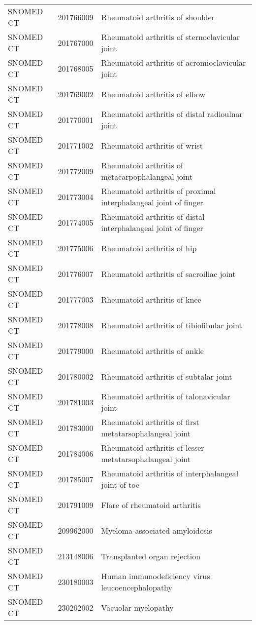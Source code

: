 \begin{longtable}{p{}p{}p{}}
  SNOMED CT & 201766009 & Rheumatoid arthritis of shoulder \\ 
  SNOMED CT & 201767000 & Rheumatoid arthritis of sternoclavicular joint \\ 
  SNOMED CT & 201768005 & Rheumatoid arthritis of acromioclavicular joint \\ 
  SNOMED CT & 201769002 & Rheumatoid arthritis of elbow \\ 
  SNOMED CT & 201770001 & Rheumatoid arthritis of distal radioulnar joint \\ 
  SNOMED CT & 201771002 & Rheumatoid arthritis of wrist \\ 
  SNOMED CT & 201772009 & Rheumatoid arthritis of metacarpophalangeal joint \\ 
  SNOMED CT & 201773004 & Rheumatoid arthritis of proximal interphalangeal joint of finger \\ 
  SNOMED CT & 201774005 & Rheumatoid arthritis of distal interphalangeal joint of finger \\ 
  SNOMED CT & 201775006 & Rheumatoid arthritis of hip \\ 
  SNOMED CT & 201776007 & Rheumatoid arthritis of sacroiliac joint \\ 
  SNOMED CT & 201777003 & Rheumatoid arthritis of knee \\ 
  SNOMED CT & 201778008 & Rheumatoid arthritis of tibiofibular joint \\ 
  SNOMED CT & 201779000 & Rheumatoid arthritis of ankle \\ 
  SNOMED CT & 201780002 & Rheumatoid arthritis of subtalar joint \\ 
  SNOMED CT & 201781003 & Rheumatoid arthritis of talonavicular joint \\ 
  SNOMED CT & 201783000 & Rheumatoid arthritis of first metatarsophalangeal joint \\ 
  SNOMED CT & 201784006 & Rheumatoid arthritis of lesser metatarsophalangeal joint \\ 
  SNOMED CT & 201785007 & Rheumatoid arthritis of interphalangeal joint of toe \\ 
  SNOMED CT & 201791009 & Flare of rheumatoid arthritis \\ 
  SNOMED CT & 209962000 & Myeloma-associated amyloidosis \\ 
  SNOMED CT & 213148006 & Transplanted organ rejection \\ 
  SNOMED CT & 230180003 & Human immunodeficiency virus leucoencephalopathy \\ 
  SNOMED CT & 230202002 & Vacuolar myelopathy \\ 

\end{longtable}
